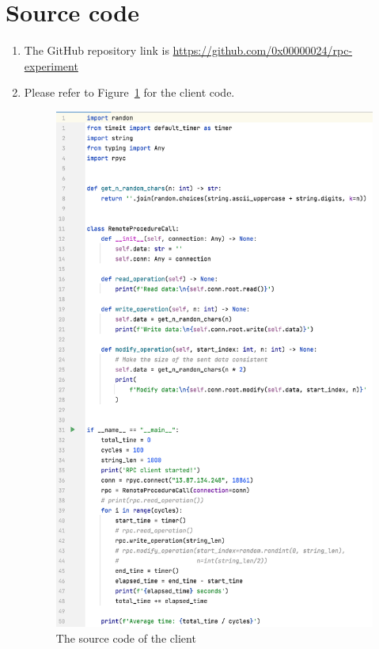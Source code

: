 \documentclass{article}
\begin{document}
\section{Source code}\label{sec:source-code}
\begin{enumerate}[label=(\alph*)]
  \item {
    The GitHub repository link is \url{https://github.com/0x00000024/rpc-experiment}
  }
  \item {
    Please refer to Figure~\ref{fig:client} for the client code.
    \begin{figure}[htp]
        \centering
        \includegraphics[width=13cm]{client}
        \caption{The source code of the client}
        \label{fig:client}

\end{figure}}
\end{enumerate}
\end{document}
